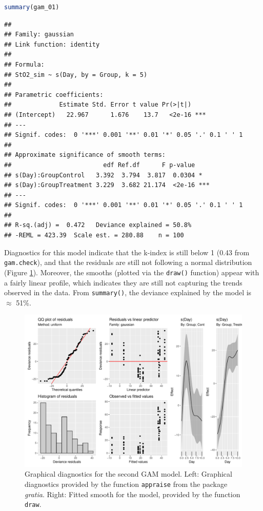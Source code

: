 \documentclass[
]{article}
\newcommand{\passthrough}[1]{#1}
\begin{document}
\begin{lstlisting}[language=R]
summary(gam_01)
\end{lstlisting}

\begin{lstlisting}
## 
## Family: gaussian 
## Link function: identity 
## 
## Formula:
## StO2_sim ~ s(Day, by = Group, k = 5)
## 
## Parametric coefficients:
##             Estimate Std. Error t value Pr(>|t|)    
## (Intercept)   22.967      1.676    13.7   <2e-16 ***
## ---
## Signif. codes:  0 '***' 0.001 '**' 0.01 '*' 0.05 '.' 0.1 ' ' 1
## 
## Approximate significance of smooth terms:
##                         edf Ref.df      F p-value    
## s(Day):GroupControl   3.392  3.794  3.817  0.0304 *  
## s(Day):GroupTreatment 3.229  3.682 21.174  <2e-16 ***
## ---
## Signif. codes:  0 '***' 0.001 '**' 0.01 '*' 0.05 '.' 0.1 ' ' 1
## 
## R-sq.(adj) =  0.472   Deviance explained = 50.8%
## -REML = 423.39  Scale est. = 280.88    n = 100
\end{lstlisting}

Diagnostics for this model indicate that the k-index is still below 1 (0.43 from \passthrough{\lstinline!gam.check!}), and that the residuals are still not following a normal distribution (Figure \ref{fig:second-GAM-diag}). Moreover, the smooths (plotted via the \passthrough{\lstinline!draw()!} function) appear with a fairly linear profile, which indicates they are still not capturing the trends observed in the data. From \passthrough{\lstinline!summary()!}, the deviance explained by the model is \(\approx\) 51\%.



\begin{figure}

{\centering \includegraphics[width=0.75\linewidth]{SIM_Appendix_files/figure-latex/second-GAM-diag-1} 

}

\caption{Graphical diagnostics for the second GAM model. Left: Graphical diagnostics provided by the function \passthrough{\lstinline!appraise!} from the package \emph{gratia}. Right: Fitted smooth for the model, provided by the function \passthrough{\lstinline!draw!}.}\label{fig:second-GAM-diag}
\end{figure}
\end{document}
